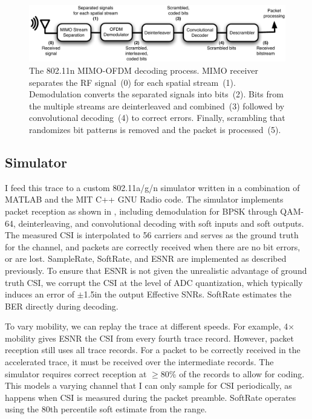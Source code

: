 \begin{figure}[ht]
\centering
\includegraphics[width=6in]{figures/esnr/mimo_ofdm_decoding_process.pdf}
\caption[The 802.11n MIMO-OFDM decoding process]{\label{fig:ofdm_decoding} The 802.11n MIMO-OFDM decoding process. MIMO receiver separates the RF signal~(0) for each spatial stream~(1). Demodulation converts the separated signals into bits~(2). Bits from the multiple streams are deinterleaved and combined~(3) followed by convolutional decoding~(4) to correct errors. Finally, scrambling that randomizes bit patterns is removed and the packet is processed~(5).}
\end{figure}


\subsection{Simulator} I feed this trace to a custom 802.11a/g/n simulator written in a combination of MATLAB and the MIT C++ GNU Radio code. The simulator implements packet reception as shown in , including demodulation for BPSK through QAM-64, deinterleaving, and convolutional decoding with soft inputs and soft outputs. The measured CSI is interpolated to 56 carriers and serves as the ground truth for the channel, and packets are correctly received when there are no bit errors, or are lost. SampleRate, SoftRate, and ESNR are implemented as described previously. To ensure that ESNR is not given the unrealistic advantage of ground truth CSI, we corrupt the CSI at the level of ADC quantization, which typically induces an error of $\pm$1.5\dB in the output Effective SNRs. SoftRate estimates the BER directly during decoding.

To vary mobility, we can replay the trace at different speeds. For example, 4$\times$ mobility gives ESNR the CSI from every fourth trace record. However, packet reception still uses all trace records. For a packet to be correctly received in the accelerated trace, it must be received over the intermediate records. The simulator requires correct reception at $\geq$80\% of the records to allow for coding. This models a varying channel that I can only sample for CSI periodically, as happens when CSI is measured during the packet preamble. SoftRate operates using the 80th percentile soft estimate from the range.

